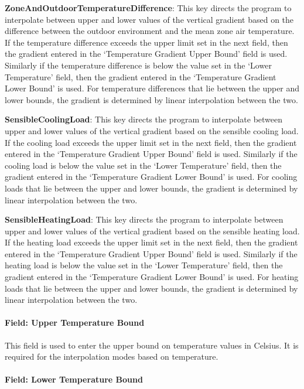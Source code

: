 \textbf{ZoneAndOutdoorTemperatureDifference}: This key directs the program to interpolate between upper and lower values of the vertical gradient based on the difference between the outdoor environment and the mean zone air temperature. If the temperature difference exceeds the upper limit set in the next field, then the gradient entered in the `Temperature Gradient Upper Bound' field is used. Similarly if the temperature difference is below the value set in the `Lower Temperature' field, then the gradient entered in the `Temperature Gradient Lower Bound' is used. For temperature differences that lie between the upper and lower bounds, the gradient is determined by linear interpolation between the two.

\textbf{SensibleCoolingLoad}: This key directs the program to interpolate between upper and lower values of the vertical gradient based on the sensible cooling load. If the cooling load exceeds the upper limit set in the next field, then the gradient entered in the `Temperature Gradient Upper Bound' field is used. Similarly if the cooling load is below the value set in the `Lower Temperature' field, then the gradient entered in the `Temperature Gradient Lower Bound' is used. For cooling loads that lie between the upper and lower bounds, the gradient is determined by linear interpolation between the two.

\textbf{SensibleHeatingLoad}: This key directs the program to interpolate between upper and lower values of the vertical gradient based on the sensible heating load. If the heating load exceeds the upper limit set in the next field, then the gradient entered in the `Temperature Gradient Upper Bound' field is used. Similarly if the heating load is below the value set in the `Lower Temperature' field, then the gradient entered in the `Temperature Gradient Lower Bound' is used. For heating loads that lie between the upper and lower bounds, the gradient is determined by linear interpolation between the two.

\paragraph{Field: Upper Temperature Bound}\label{field-upper-temperature-bound}

This field is used to enter the upper bound on temperature values in Celsius. It is required for the interpolation modes based on temperature.

\paragraph{Field: Lower Temperature Bound}\label{field-lower-temperature-bound}

